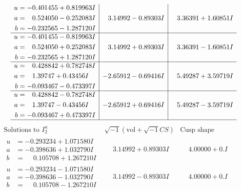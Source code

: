 \documentclass[1p]{elsarticle_modified}
\theoremstyle{definition}
\newcommand{\I}{\sqrt{-1}}
\begin{document}
$$\begin{array}{c|c|c}
\begin{aligned}
u &= -0.401455 + 0.819963 I \\
a &= \phantom{-}0.524050 - 0.252083 I \\
b &= -0.232565 - 1.287120 I\end{aligned}
 & \phantom{-}3.14992 - 0.89303 I & \phantom{-}3.36391 + 1.60851 I \\ \hline\begin{aligned}
u &= -0.401455 - 0.819963 I \\
a &= \phantom{-}0.524050 + 0.252083 I \\
b &= -0.232565 + 1.287120 I\end{aligned}
 & \phantom{-}3.14992 + 0.89303 I & \phantom{-}3.36391 - 1.60851 I \\ \hline\begin{aligned}
u &= \phantom{-}0.428842 + 0.782748 I \\
a &= \phantom{-}1.39747 + 0.43456 I \\
b &= -0.093467 - 0.473397 I\end{aligned}
 & -2.65912 - 0.69416 I & \phantom{-}5.49287 + 3.59719 I \\ \hline\begin{aligned}
u &= \phantom{-}0.428842 - 0.782748 I \\
a &= \phantom{-}1.39747 - 0.43456 I \\
b &= -0.093467 + 0.473397 I\end{aligned}
 & -2.65912 + 0.69416 I & \phantom{-}5.49287 - 3.59719 I\\
 \hline 
 \end{array}$$\newpage$$\begin{array}{c|c|c}  
\text{Solutions to }I^u_{2}& \I (\text{vol} + \sqrt{-1}CS) & \text{Cusp shape}\\
 \hline 
\begin{aligned}
u &= -0.293234 + 1.071580 I \\
a &= -0.398636 + 1.032790 I \\
b &= \phantom{-}0.105708 + 1.267210 I\end{aligned}
 & \phantom{-}3.14992 + 0.89303 I & \phantom{-}4.00000 + 0. I\phantom{ +0.000000I} \\ \hline\begin{aligned}
u &= -0.293234 - 1.071580 I \\
a &= -0.398636 - 1.032790 I \\
b &= \phantom{-}0.105708 - 1.267210 I\end{aligned}
 & \phantom{-}3.14992 - 0.89303 I & \phantom{-}4.00000 + 0. I\phantom{ +0.000000I} \\ \hline\begin{aligned}

\end{aligned}
\end{array}$$
\end{document}
